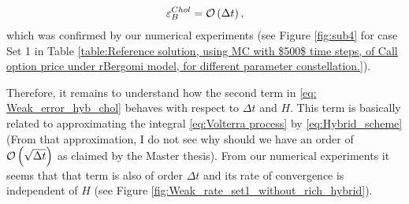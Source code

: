 \begin{align*}
\varepsilon_{B}^{Chol}={\mathcal{O}}\left(\Delta t\right),
\end{align*}
which was confirmed by our numerical experiments (see Figure \ref{fig:sub4} for case Set 1  in Table \ref{table:Reference solution, using MC with $500$ time steps, of Call option price under rBergomi model, for different parameter constellation.}). 

Therefore, it remains to understand how the second term in \ref{eq: Weak_error_hyb_chol} behaves with respect to $\Delta t $ and $H$. This term is basically related to approximating the integral \eqref{eq:Volterra process}  by \eqref{eq:Hybrid_scheme} (From that approximation, I do not see why should we have an order of ${\mathcal{O}}\left(\sqrt{\Delta t}\right)$ as claimed by the Master thesis). From our numerical experiments it seems that that term is also of order $\Delta t$  and its rate of convergence is independent of $H$ (see Figure \ref{fig:Weak_rate_set1_without_rich_hybrid}).